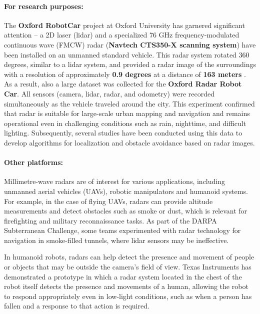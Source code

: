\paragraph{For research purposes:} 

The \textbf{Oxford RobotCar} project at Oxford University has garnered significant attention – a 2D laser (lidar) and a specialized 76 GHz frequency-modulated continuous wave (FMCW) radar (\textbf{Navtech CTS350-X scanning system}) have been installed on an unmanned standard vehicle.\citep{Barnes2020RadarRobotCar}
This radar system rotated 360 degrees, similar to a lidar system, and provided a radar image of the surroundings with a resolution of approximately \textbf{0.9 degrees} at a distance of \textbf{163 meters}   .
As a result, also a large dataset was collected for the \textbf{Oxford Radar Robot Car}. All sensors (camera, lidar, radar, and odometry) were recorded simultaneously as the vehicle traveled around the city.
This experiment confirmed that radar is suitable for large-scale urban mapping and navigation and remains operational even in challenging conditions such as rain, nighttime, and difficult lighting. Subsequently, several studies have been conducted using this data to develop algorithms for localization and obstacle avoidance based on radar images.
\paragraph{Other platforms:} 


Millimetre-wave radars are of interest for various applications, including unmanned aerial vehicles (UAVs), robotic manipulators and humanoid systems. For example, in the case of flying UAVs, radars can provide altitude measurements and detect obstacles such as smoke or dust, which is relevant for firefighting and military reconnaissance tasks. As part of the DARPA Subterranean Challenge, some teams experimented with radar technology for navigation in smoke-filled tunnels, where lidar sensors may be ineffective.

In humanoid robots, radars can help detect the presence and movement of people or objects that may be outside the camera's field of view. Texas Instruments has demonstrated a prototype in which a radar system located in the chest of the robot itself detects the presence and movements of a human, allowing the robot to respond appropriately even in low-light conditions, such as when a person has fallen and a response to that action is required.\citep{TI_SWRA831_2024}

